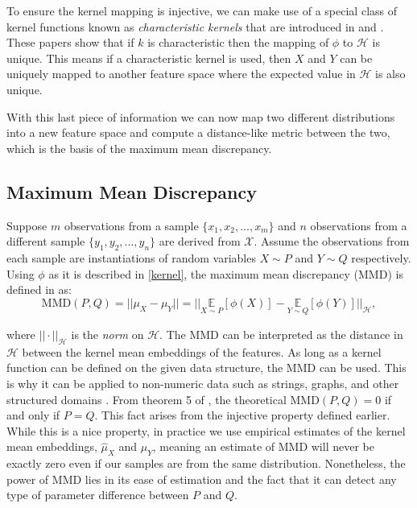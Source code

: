 To ensure the kernel mapping is injective, we can make use of a special class of kernel functions known as \textit{characteristic kernels} that are introduced in \cite{fukumizu2008kernel} and \cite{sriperumbudur2011universality}. These papers show that if $k$ is characteristic then the mapping of $\phi$ to $\mathcal{H}$ is unique. This means if a characteristic kernel is used, then $X$ and $Y$ can be uniquely mapped to another feature space where the expected value in $\mathcal{H}$ is also unique. 

With this last piece of information we can now map two different distributions into a new feature space and compute a distance-like metric between the two, which is the basis of the maximum mean discrepancy.   %

\subsection{Maximum Mean Discrepancy}
Suppose $m$ observations from a sample $\{x_1, x_2, ..., x_m\}$ and $n$ observations from a different sample $\{y_1, y_2, ..., y_n\}$ are derived from $\mathcal{X}$. Assume the observations from each sample are instantiations of random variables $X \sim  P$ and $Y \sim Q$ respectively. Using $\phi$ as it is described in \ref{kernel}, the maximum mean discrepancy (MMD) is defined in \cite{smola2007hilbert} as:
\begin{equation}
\label{mmd_theory}
\text{MMD}(P,Q)=||\mu_X - \mu_Y ||=|| \underset{X \sim P}{\mathbb{E}}[\phi(X)] -  \underset{Y \sim Q}{\mathbb{E}}[\phi(Y)]||_\mathcal{H},
\end{equation}

where $||\cdot||_\mathcal{H}$ is the \textit{norm} on $\mathcal{H}$. The MMD can be interpreted as the distance in $\mathcal{H}$ between the kernel mean embeddings of the features. As long as a kernel function can be defined on the given data structure, the MMD can be used. This is why it can be applied to non-numeric data such as strings, graphs, and other structured domains \cite{hofmann2008kernel}. From theorem 5 of \cite{gretton2012kernel}, the theoretical MMD$(P,Q) = 0$ if and only if $P=Q$. This fact arises from the injective property defined earlier. While this is a nice property, in practice we use empirical estimates of the kernel mean embeddings, $\hat{\mu}_X $ and $\hat{\mu}_Y$, meaning an estimate of MMD will never be exactly zero even if our samples are from the same distribution. Nonetheless, the power of MMD lies in its ease of estimation and the fact that it can detect any type of parameter difference between $P$ and $Q$. 

